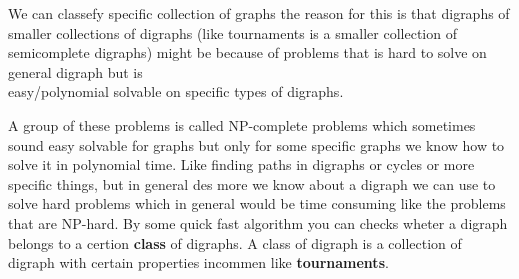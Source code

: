 We can classefy specific collection of graphs the reason for this is that digraphs of smaller collections of digraphs (like tournaments is a smaller collection of semicomplete digraphs) might be because of problems that is hard to solve on general digraph but is \\
easy/polynomial solvable on specific types of digraphs.

A group of these problems is called NP-complete problems which sometimes sound easy solvable for graphs but only for some specific graphs we know how to solve it in polynomial time. 
Like finding paths in digraphs or cycles or more specific things, but in general des more we know about a digraph we can use to solve hard problems which in general would be time consuming like the problems that are NP-hard.
By some quick fast algorithm you can checks wheter a digraph belongs to a certion \textbf{class} of digraphs. 
A class of digraph is a collection of digraph with certain properties incommen like \textbf{tournaments}.\\
